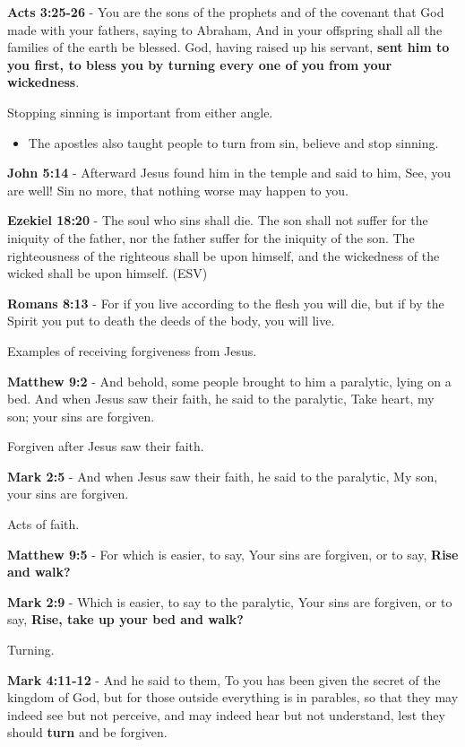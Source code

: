 \documentclass[11pt]{article}
\begin{document}
\textbf{Acts 3:25-26} - You are the sons of the prophets and of the covenant that God made with your fathers, saying to Abraham, And in your offspring shall all the families of the earth be blessed. God, having raised up his servant, \textbf{sent him to you first, to bless you by turning every one of you from your wickedness}.

Stopping sinning is important from either angle.

\begin{itemize}
\item The apostles also taught people to turn from sin, believe and stop sinning.
\end{itemize}

\textbf{John 5:14} - Afterward Jesus found him in the temple and said to him, See, you are well! Sin no more, that nothing worse may happen to you.

\textbf{Ezekiel 18:20} - The soul who sins shall die. The son shall not suffer for the iniquity of the father, nor the father suffer for the iniquity of the son. The righteousness of the righteous shall be upon himself, and the wickedness of the wicked shall be upon himself. (ESV)

\textbf{Romans 8:13} - For if you live according to the flesh you will die, but if by the Spirit you put to death the deeds of the body, you will live.

Examples of receiving forgiveness from Jesus.

\textbf{Matthew 9:2} - And behold, some people brought to him a paralytic, lying on a bed. And when Jesus saw their faith, he said to the paralytic, Take heart, my son; your sins are forgiven.

Forgiven after Jesus saw their faith.

\textbf{Mark 2:5} - And when Jesus saw their faith, he said to the paralytic, My son, your sins are forgiven.

Acts of faith.

\textbf{Matthew 9:5} - For which is easier, to say, Your sins are forgiven, or to say, \textbf{Rise and walk?}

\textbf{Mark 2:9} - Which is easier, to say to the paralytic, Your sins are forgiven, or to say, \textbf{Rise, take up your bed and walk?}

Turning.

\textbf{Mark 4:11-12} - And he said to them, To you has been given the secret of the kingdom of God, but for those outside everything is in parables, so that they may indeed see but not perceive, and may indeed hear but not understand, lest they should \textbf{turn} and be forgiven.
\end{document}
